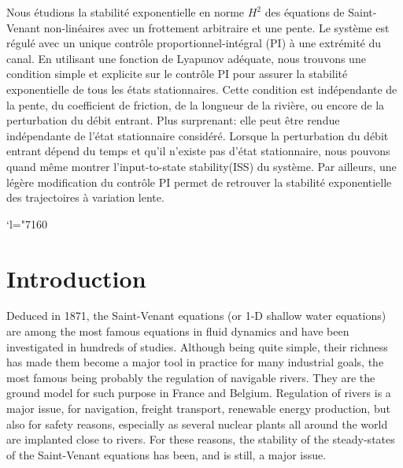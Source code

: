 \documentclass[JEP,XML,SOM,Unicode]{cedram}
\newcommand{\Changel}{\mathcode`l="7160}
\theoremstyle{definition}
\begin{document}
\begin{altabstract}
Nous étudions la stabilité exponentielle en norme $H^{2}$ des équations de Saint-Venant non-linéaires avec un frottement arbitraire et une pente. Le système est régulé avec un unique contrôle proportionnel-intégral (PI) à une extrémité du canal. En utilisant une fonction de Lyapunov adéquate, nous trouvons une condition simple et explicite sur le contrôle PI pour assurer la stabilité exponentielle de tous les états stationnaires. Cette condition est indépendante de la pente, du coefficient de friction, de la longueur de la rivière, ou encore de la perturbation du débit entrant. Plus surprenant: elle peut être rendue indépendante de l'état stationnaire considéré. Lorsque la perturbation du débit entrant dépend du temps et qu'il n'existe pas d'état stationnaire, nous pouvons quand même montrer l'\og input-to-state stability\fg (ISS) du système. Par ailleurs, une légère modification du contrôle PI permet de retrouver la stabilité exponentielle des trajectoires à variation lente.
\end{altabstract}

\maketitle
\vspace*{-.2\baselineskip}
\tableofcontents
\mainmatter
\Changel

\section*{Introduction}
{Deduced} in 1871, the Saint-Venant equations \cite{SaintVenant} (or 1-D shallow water equations) are among the most famous equations in fluid dynamics and have been investigated in hundreds of studies.
Although being quite simple, their richness has made them become a major tool in practice for many industrial goals, the most famous being probably the regulation of navigable rivers.
They are the ground model for such purpose in France and Belgium.
Regulation of rivers
is a major issue, for navigation, freight transport,
renewable energy production,
but also for safety reasons, especially as
several nuclear plants all around the world are implanted close to rivers.
For these reasons, the stability of the steady-states of the Saint-Venant equations has been, and is still, a major issue.
\end{document}
